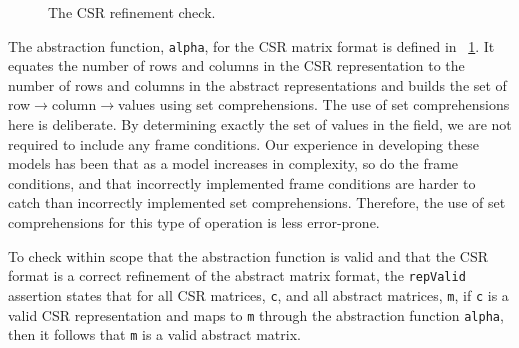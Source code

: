 \begin{figure}

\caption{The CSR refinement check.}
\label{model:csr-ref}
\end{figure}

The abstraction function, \texttt{alpha}, for the CSR matrix format is defined in \figurename~\ref{model:csr-ref}.  It equates the number of rows and columns in the CSR representation to the number of rows and columns in the abstract representations and builds the set of row$\rightarrow$column$\rightarrow$values using set comprehensions.  The use of set comprehensions here is deliberate.  By determining exactly the set of values in the field, we are not required to include any frame conditions.  Our experience in developing these models has been that as a model increases in complexity, so do the frame conditions, and that incorrectly implemented frame conditions are harder to catch than incorrectly implemented set comprehensions.  Therefore, the use of set comprehensions for this type of operation is less error-prone.

To check within scope that the abstraction function is valid and that the CSR format is a correct refinement of the abstract matrix format, the \texttt{repValid} assertion states that for all CSR matrices, \texttt{c}, and all abstract matrices, \texttt{m}, if \texttt{c} is a valid CSR representation and maps to \texttt{m} through the abstraction function \texttt{alpha}, then it follows that \texttt{m} is a valid abstract matrix.